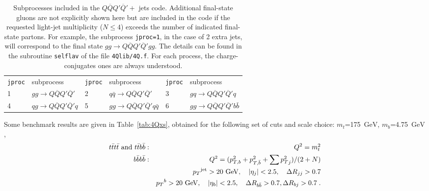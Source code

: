 \documentclass[paper]{JHEP3}
\newcommand{\gev}{\mbox{GeV}}
\newcommand{\ccaption}[2]{
    \begin{center}
    \parbox{0.85\textwidth}{
      \caption[#1]{\small{{#2}}}
      }
    \end{center}
    }
\def    \ba             {\begin{eqnarray}}
\def    \ea             {\end{eqnarray}}
\def    \gev            {\mbox{$\mathrm{GeV}$}}
\def    \qbar   {\bar{q}}
\def    \bbar   {\bar{b}}
\def    \tbar   {\bar{t}}
\def    \Qbar   {\overline{Q}}
\def    \mt             {\mbox{$m_t$}}
\def    \mtsq             {\mbox{$m_t^2$}}
\def    \mb             {\mbox{$m_b$}}
\def    \pt             {\mbox{$p_T$}}
\def    \ptsq           {\mbox{$p^2_T$}}
\def    \ptbsq           {\mbox{$p^2_{T,b}$}}
\def    \ptbbsq           {\mbox{$p^2_{T,\bar{b}}$}}
\begin{document}
\begin{table}
\begin{center}
\begin{tabular}{ll|ll|ll}
{\tt jproc} & subprocess & {\tt jproc} & subprocess & {\tt jproc} &
subprocess \\ 
1 &  $g g \to  Q\Qbar Q'\Qbar'$ 
&2 &  $q \qbar \to Q\Qbar Q'\Qbar' $ 
&3 &  $g q \to  Q\Qbar Q'\Qbar' q$ 
\\
4 &  $ q g \to Q\Qbar Q'\Qbar' q$ 
&5 &  $g g  \to  Q \Qbar Q'\Qbar' q \qbar$ 
&6 &  $g g  \to Q \Qbar Q'\Qbar' b {\bar{b}}$ 
\end{tabular}
\ccaption{}{\label{tab:4Q} Subprocesses included in the $Q\Qbar Q'\Qbar'+$
  jets code. Additional final-state gluons are not explicitly 
  shown here but are included in the code if the requested light-jet
  multiplicity ($N\le 4$) exceeds the number of indicated final-state partons.
 For example, the subprocess {\tt jproc=1}, in the case of 2 extra 
  jets, will correspond to the final state  $gg\to Q\Qbar Q'\Qbar' g g$.
  The details can be found in the subroutine {\tt selflav} of
  the file {\tt 4Qlib/4Q.f}. For each process, the charge-conjugates 
  ones are always understood. }
\end{center}
\end{table}
Some benchmark results are given in Table~\ref{tab:4Qxs}, obtained
for the following set of cuts and scale choice:
\mt=175~\gev, \mb=4.75~\gev, 
\ba \label{eq:4Qcut1}
t\tbar t\tbar {\rm ~and~} t\tbar b\bbar : && Q^2=\mtsq
\\
b\bbar b\bbar: && Q^2=(\ptbsq+\ptbbsq+\sum \ptsq_j)/(2+N)
\\
        && \pt^{\rm jet}>20~\gev, \quad \vert \eta_j\vert < 2.5, \quad \Delta
        R_{jj} >0.7
\\
        && \pt^{b}>20~\gev, \quad \vert \eta_b \vert < 2.5, \quad \Delta
        R_{b\bbar} >0.7, \Delta R_{bj} >0.7 \; .
\label{eq:4Qcut2}
\ea
\end{document}
